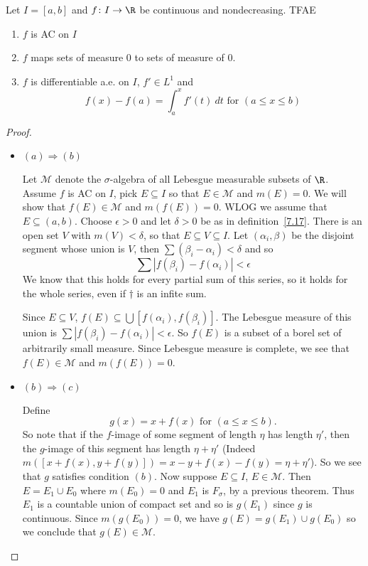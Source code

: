 \begin{theorem}\label{7.18}
    Let $I=[a,b]$ and $f\colon I\rightarrow \R$ be continuous and nondecreasing. TFAE\begin{enumerate}[label=(\alph*)]
        \item $f$ is AC on $I$
        \item $f$ maps sets of measure $0$ to sets of measure of $0$.
        \item $f$ is differentiable a.e. on $I$, $f'\in L^1$ and \[
            f(x) - f(a) = \int_a^x f'(t)~dt \text{ for }(a\leq x\leq b)    
        \]
    \end{enumerate}

    \begin{proof}
        \begin{itemize}
            \item $(a)\Rightarrow (b)$
            
            Let $\mathcal{M}$ denote the $\sigma$-algebra of all Lebesgue measurable subsets of $\R$. Assume $f$ is AC on $I$, pick $E\subseteq I$ so that $E\in \mathcal{M}$ and $m(E) = 0$. We will show that $f(E)\in \mathcal{M}$ and $m(f(E)) = 0$. WLOG we assume that $E\subseteq (a,b)$.
            Choose $\epsilon>0 $ and let $\delta>0$ be as in definition~\ref{7.17}. There is an open set $V$ with $m(V)<\delta$, so that $E\subseteq V\subseteq I$. Let $(\alpha_i,\beta)$ be the disjoint segment whose union is $V$, then $\sum (\beta_i-\alpha_i)<\delta$ and so \[
                \sum |f(\beta_i)-f(\alpha_i)|<\epsilon \tag{$dagger$}
            \]
            We know that this holds for every partial sum of this series, so it holds for the whole series, even if $\dagger$ is an infite sum.
            
            Since $E\subseteq V$, $f(E)\subseteq \bigcup [f(\alpha_i),f(\beta_i)]$. The Lebesgue measure of this union is $\sum |f(\beta_i)-f(\alpha_i)|<\epsilon$. So $f(E)$ is a subset of a borel set of arbitrarily small measure. Since Lebesgue measure is complete, we see that $f(E)\in \mathcal{M}$ and $m(f(E)) = 0$.
            \item $(b)\Rightarrow (c)$
            
            Define \[
                g(x) = x+f(x) \text{ for }(a\leq x\leq b).    
            \]
            So note that if the $f$-image of some segment of length $\eta$ has length $\eta'$, then the $g$-image of this segment has length $\eta+\eta'$ (Indeed $m([x+f(x),y+f(y)]) = x-y+f(x)-f(y) = \eta+\eta'$).  
            So we see that $g$ satisfies condition $(b)$. Now suppose $E\subseteq I$, $E\in \mathcal{M}$. Then $E = E_1\cup E_0$ where $m(E_0) = 0$ and $E_1$ is $F_\sigma$, by a previous theorem. Thus $E_1$ is a countable union of compact set and so is $g(E_1)$ since $g$ is continuous. Since $m(g(E_0)) = 0$, we have $g(E) = g(E_1)\cup g(E_0)$ so we conclude that $g(E)\in \mathcal{M}$.


\end{itemize}
\end{proof}
\end{theorem}
